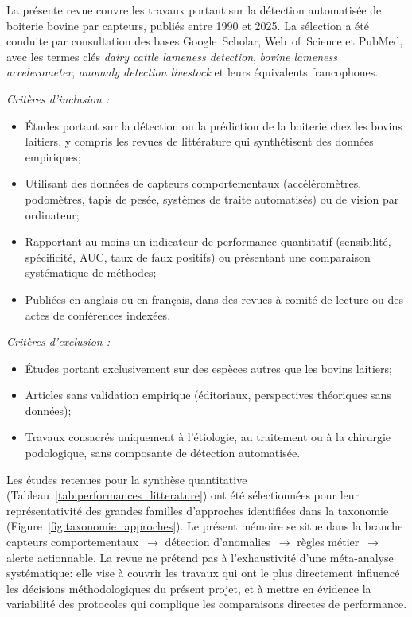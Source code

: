 La présente revue couvre les travaux portant sur la détection automatisée de boiterie
bovine par capteurs, publiés entre 1990 et 2025. La sélection a été conduite par
consultation des bases Google~Scholar, Web~of~Science et PubMed, avec les termes clés
\textit{dairy cattle lameness detection}, \textit{bovine lameness accelerometer},
\textit{anomaly detection livestock} et leurs équivalents francophones.

\textit{Critères d'inclusion :}
\begin{itemize}
    \item Études portant sur la détection ou la prédiction de la boiterie chez les bovins
    laitiers, y compris les revues de littérature qui synthétisent des données empiriques;
    \item Utilisant des données de capteurs comportementaux (accéléromètres, podomètres,
    tapis de pesée, systèmes de traite automatisés) ou de vision par ordinateur;
    \item Rapportant au moins un indicateur de performance quantitatif (sensibilité,
    spécificité, AUC, taux de faux positifs) ou présentant une comparaison systématique
    de méthodes;
    \item Publiées en anglais ou en français, dans des revues à comité de lecture ou des
    actes de conférences indexées.
\end{itemize}

\textit{Critères d'exclusion :}
\begin{itemize}
    \item Études portant exclusivement sur des espèces autres que les bovins laitiers;
    \item Articles sans validation empirique (éditoriaux, perspectives théoriques sans
    données);
    \item Travaux consacrés uniquement à l'étiologie, au traitement ou à la chirurgie
    podologique, sans composante de détection automatisée.
\end{itemize}

Les études retenues pour la synthèse quantitative
(Tableau~\ref{tab:performances_litterature}) ont été sélectionnées pour leur
représentativité des grandes familles d'approches identifiées dans la taxonomie
(Figure~\ref{fig:taxonomie_approches}). Le présent mémoire se situe dans la branche
capteurs comportementaux~$\rightarrow$ détection d'anomalies~$\rightarrow$ règles
métier~$\rightarrow$ alerte actionnable. La revue ne prétend pas à l'exhaustivité d'une
méta-analyse systématique: elle vise à couvrir les travaux qui ont le plus directement
influencé les décisions méthodologiques du présent projet, et à mettre en évidence la
variabilité des protocoles qui complique les comparaisons directes de performance.


